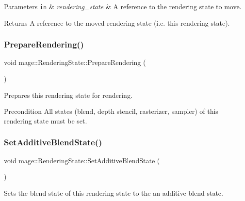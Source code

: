 \begin{DoxyParams}[1]{Parameters}
\mbox{\tt in}  & {\em rendering\+\_\+state} & A reference to the rendering state to move. \\
\hline
\end{DoxyParams}
\begin{DoxyReturn}{Returns}
A reference to the moved rendering state (i.\+e. this rendering state). 
\end{DoxyReturn}
\hypertarget{structmage_1_1_rendering_state_ac685d7f5b0832bc4af9e09ed3f50bf22}{}\label{structmage_1_1_rendering_state_ac685d7f5b0832bc4af9e09ed3f50bf22} 
\subsubsection{\texorpdfstring{Prepare\+Rendering()}{PrepareRendering()}}
{\footnotesize\ttfamily void mage\+::\+Rendering\+State\+::\+Prepare\+Rendering (\begin{DoxyParamCaption}{ }\end{DoxyParamCaption})}

Prepares this rendering state for rendering.

\begin{DoxyPrecond}{Precondition}
All states (blend, depth stencil, rasterizer, sampler) of this rendering state must be set. 
\end{DoxyPrecond}
\hypertarget{structmage_1_1_rendering_state_a61341d0fc7f1140faaf8fb33f9bb13fb}{}\label{structmage_1_1_rendering_state_a61341d0fc7f1140faaf8fb33f9bb13fb} 
\subsubsection{\texorpdfstring{Set\+Additive\+Blend\+State()}{SetAdditiveBlendState()}}
{\footnotesize\ttfamily void mage\+::\+Rendering\+State\+::\+Set\+Additive\+Blend\+State (\begin{DoxyParamCaption}{ }\end{DoxyParamCaption})}

Sets the blend state of this rendering state to the an additive blend state.


